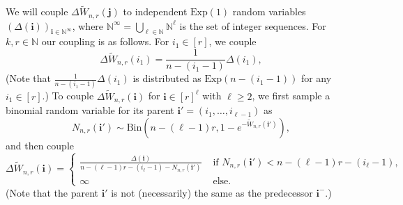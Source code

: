 \documentclass[11pt]{article}
\theoremstyle{definition}
\theoremstyle{remark}
\theoremstyle{remark}
\numberwithin{theorem}{section}
\begin{document}
We will couple $\Delta \widetilde{W}_{n,r}(\bm{j})$ to independent $\text{Exp}(1)$ random variables $(\Delta(\bm{i}))_{\bm{i}\in\mathbb{N}^\infty}$, where $\mathbb{N}^\infty=\bigcup_{\ell\in\mathbb{N}}\mathbb{N}^\ell$ is the set of integer sequences. For $k,r\in\mathbb{N}$ our coupling is as follows. For $i_1\in[r]$, we couple
\[
\Delta \widetilde{W}_{n,r}(i_1)=\frac{1}{n-(i_1-1)}\Delta(i_1),
\]
(Note that $\frac{1}{n-(i_{1}-1)}\Delta(i_{1})$ is distributed as $\text{Exp}(n-(i_{1}-1))$ for any $i_{1} \in [r]$.) To couple $\Delta \widetilde{W}_{n,r}(\bm i)$ for $\bm i\in[r]^\ell$ with $\ell\ge2$, we first sample a binomial random variable for its parent $\bm i'=(i_1,\dots,i_{\ell-1})$ as
\begin{equation}\label{eq:coupling-N}
N_{n,r}(\bm i')\sim\text{Bin}(n-(\ell-1)r,1-e^{-\widetilde{W}_{n,r}(\bm i')}),
\end{equation}
and then couple
\begin{equation}\label{eq:coupling}
\Delta \widetilde{W}_{n,r}(\bm i)=\begin{cases}
    \frac{\Delta(\bm i)}{n-(\ell-1)r-(i_\ell-1)-N_{n,r}(\bm i')}&\text{ if $N_{n,r}(\bm i')<n-(\ell-1)r-(i_\ell-1)$,}\\
    \infty&\text{ else.}
\end{cases}
\end{equation}
(Note that the parent $\bm i'$ is not (necessarily) the same as the predecessor $\bm i^-$.)
\end{document}
